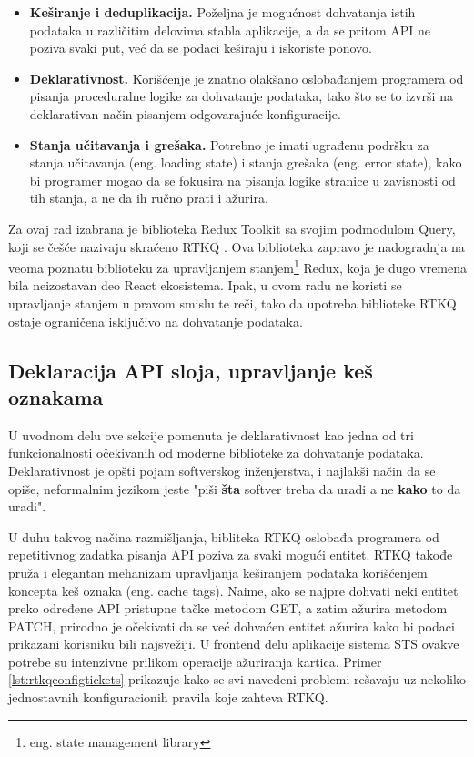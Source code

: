 \documentclass[12pt,oneside]{memoir}
\begin{document}
\begin{itemize}
    \item \textbf{Keširanje i deduplikacija.} Poželjna je mogućnost dohvatanja istih podataka u različitim delovima stabla aplikacije, a da se pritom API ne poziva svaki put, već da se podaci keširaju i iskoriste ponovo.
    \item \textbf{Deklarativnost.} Korišćenje je znatno olakšano oslobađanjem programera od pisanja proceduralne logike za dohvatanje podataka, tako što se to izvrši na deklarativan način pisanjem odgovarajuće konfiguracije.
    \item \textbf{Stanja učitavanja i grešaka.} Potrebno je imati ugrađenu podršku za stanja učitavanja (eng. loading state) i stanja grešaka (eng. error state), kako bi programer mogao da se fokusira na pisanja logike stranice u zavisnosti od tih stanja, a ne da ih ručno prati i ažurira.
\end{itemize}

Za ovaj rad izabrana je biblioteka Redux Toolkit sa svojim podmodulom Query, koji se češće nazivaju skraćeno RTKQ \cite{rtkqdocs}. Ova biblioteka zapravo je nadogradnja na veoma poznatu biblioteku za upravljanjem stanjem\footnote{eng. state management library} Redux, koja je dugo vremena bila neizostavan deo React ekosistema. Ipak, u ovom radu ne koristi se upravljanje stanjem u pravom smislu te reči, tako da upotreba biblioteke RTKQ ostaje ograničena isključivo na dohvatanje podataka.

\subsection{Deklaracija API sloja, upravljanje keš oznakama}
U uvodnom delu ove sekcije pomenuta je deklarativnost kao jedna od tri funkcionalnosti očekivanih od moderne biblioteke za dohvatanje podataka. Deklarativnost je opšti pojam softverskog inženjerstva, i najlakši način da se opiše, neformalnim jezikom jeste "piši \textbf{šta} softver treba da uradi a ne \textbf{kako} to da uradi".

U duhu takvog načina razmišljanja, bibliteka RTKQ oslobađa programera od repetitivnog zadatka pisanja API poziva za svaki mogući entitet. RTKQ takođe pruža i elegantan mehanizam upravljanja keširanjem podataka korišćenjem koncepta keš oznaka (eng. cache tags). Naime, ako se najpre dohvati neki entitet preko određene API pristupne tačke metodom GET, a zatim ažurira metodom PATCH, prirodno je očekivati da se već dohvaćen entitet ažurira kako bi podaci prikazani korisniku  bili najsvežiji. U frontend delu aplikacije sistema STS ovakve potrebe su intenzivne prilikom operacije ažuriranja kartica.  Primer \ref{lst:rtkqconfigtickets} prikazuje kako se svi navedeni problemi rešavaju uz nekoliko jednostavnih konfiguracionih pravila koje zahteva RTKQ.
\end{document}
